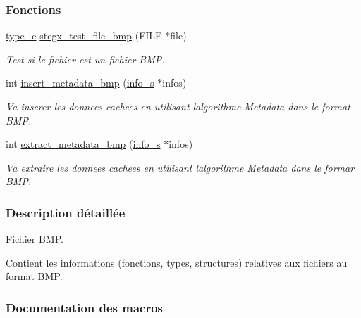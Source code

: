 \subsubsection*{Fonctions}
\begin{DoxyCompactItemize}
\item 
\hyperlink{a00047_af1ca434cca36ba9fb2a45f6cef3a16d6}{type\+\_\+e} \hyperlink{a00074_a9981cb05f84d85245b570a20ece33548}{stegx\+\_\+test\+\_\+file\+\_\+bmp} (F\+I\+LE $\ast$file)
\begin{DoxyCompactList}\small\item\em Test si le fichier est un fichier B\+MP. \end{DoxyCompactList}\item 
int \hyperlink{a00074_a9b0bec96351bc1e6be9134900590d215}{insert\+\_\+metadata\+\_\+bmp} (\hyperlink{a00008_aa8ca908d92fb5bdd3c0a9e1f58b2cf03}{info\+\_\+s} $\ast$infos)
\begin{DoxyCompactList}\small\item\em Va inserer les donnees cachees en utilisant l\textquotesingle{}algorithme Metadata dans le format B\+MP. \end{DoxyCompactList}\item 
int \hyperlink{a00074_a14e9a0ddec04cc168cbfe21cd839166e}{extract\+\_\+metadata\+\_\+bmp} (\hyperlink{a00008_aa8ca908d92fb5bdd3c0a9e1f58b2cf03}{info\+\_\+s} $\ast$infos)
\begin{DoxyCompactList}\small\item\em Va extraire les donnees cachees en utilisant l\textquotesingle{}algorithme Metadata dans le formar B\+MP. \end{DoxyCompactList}\end{DoxyCompactItemize}


\subsubsection{Description détaillée}
Fichier B\+MP. 

Contient les informations (fonctions, types, structures) relatives aux fichiers au format B\+MP. 

\subsubsection{Documentation des macros}
\mbox{\label{a00074_ae841f349a23333f726a7ae9e7c54eb74}} 
